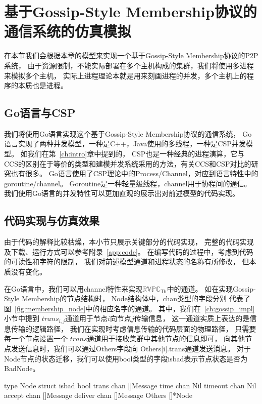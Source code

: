 \section{基于Gossip-Style Membership协议的通信系统的仿真模拟}
在本节我们会根据本章的模型来实现一个基于Gossip-Style Membership协议的P2P系统，
由于资源限制，不能实际部署在多个主机构成的集群，我们将使用多进程来模拟多个主机，
实际上进程理论本就是用来刻画进程的并发，多个主机上的程序的本质也是进程。

\subsection{Go语言与CSP}
我们将使用Go语言实现这个基于Gossip-Style Membership协议的通信系统，
Go语言实现了两种并发模型，一种是C++，Java使用的多线程，一种是CSP\cite{Hoare_CSP}并发模型。
如我们在第~\ref{ch:intro}章中提到的，
CSP也是一种经典的进程演算，它与CCS的区别在于等价的类型和建模并发系统采用的方法，有关CCS和CSP对比的研究也有很多\cite{DIFF_CCS_CSP,CCS_CSP1,CCS_CSP2,CCS_CSP3}。
Go语言使用了CSP理论中的Process/Channel，对应到语言特性中的 goroutine/channel\cite{Golang}。
Goroutine是一种轻量级线程，channel用于协程间的通信。
我们使用Go语言的并发特性可以更加直观的展示出对前述模型的代码实现。


\subsection{代码实现与仿真效果}

 由于代码的解释比较枯燥，本小节只展示关键部分的代码实现，
 完整的代码实现及下载、运行方式可以参考附录~\ref{app:code}。
 在编写代码的过程中，考虑到代码的可读性和字符的限制，
 我们对前述模型通道和进程状态的名称有所修改，
 但本质没有变化。

 在Go语言中，我们可以用channel特性来实现$\mathbb{RVPC}_{\mathsf{Th}}$中的通道。
 如在实现Gossip-Style Membership的节点结构时，
 Node结构体中，chan类型的字段分别
 代表了图~\ref{fig:membership_node}中的相应名字的通道。
 其中，我们在~\ref{ch:gossip_impl}小节中提到
 $trans_{i,j}$通道用于节点$i$向节点$j$传输信息，
 这一通道实质上表达的是信息传输的逻辑路径，
 我们在实现时考虑信息传输的代码层面的物理路径，
 只需要每一个节点设置一个
 $trans$通道用于接收集群中其他节点的信息即可，
 向其他节点发送信息时，我们可以通过Others字段向
 Others[i].trans通道发送消息。
 对于Node节点的状态迁移，我们可以使用bool类型的字段isbad表示节点状态是否为BadNode。
 \begin{codeblock}[language=GO]
   type Node struct {
      isbad bool
      trans chan []Message
      time chan Nil
      timeout chan Nil
      accept chan []Message
      deliver chan []Message
      Others []*Node
   }
\end{codeblock}


